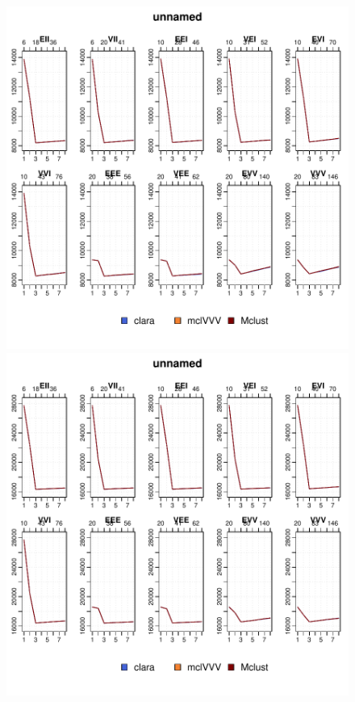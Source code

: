 \begin{figure}[h]
    \centering
    \begin{minipage}{0.45\textwidth}
\includegraphics{App_plots-fig5fit}
    \end{minipage}
    \begin{minipage}{0.45\textwidth}
\includegraphics{App_plots-fig10fit}
    \end{minipage}
\end{figure}

